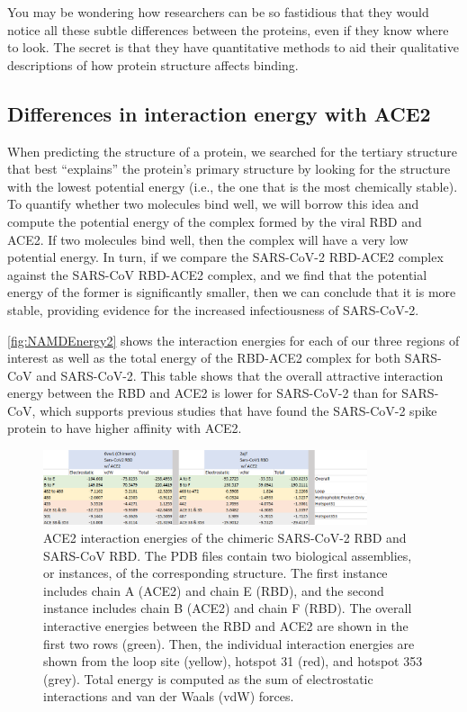 You may be wondering how researchers can be so fastidious that they would notice all these subtle differences between the proteins, even if they know where to look. The secret is that they have quantitative methods to aid their qualitative descriptions of how protein structure affects binding.

\FloatBarrier
{}
\subsection{Differences in interaction energy with ACE2}

When predicting the structure of a protein, we searched for the tertiary structure that best ``explains'' the protein's primary structure by looking for the structure with the lowest potential energy (i.e., the one that is the most chemically stable). To quantify whether two molecules bind well, we will borrow this idea and compute the potential energy of the complex formed by the viral RBD and ACE2. If two molecules bind well, then the complex will have a very low potential energy. In turn, if we compare the SARS-CoV-2 RBD-ACE2 complex against the SARS-CoV RBD-ACE2 complex, and we find that the potential energy of the former is significantly smaller, then we can conclude that it is more stable, providing evidence for the increased infectiousness of SARS-CoV-2.

\autoref{fig:NAMDEnergy2} shows the interaction energies for each of our three regions of interest as well as the total energy of the RBD-ACE2 complex for both SARS-CoV and SARS-CoV-2. This table shows that the overall attractive interaction energy between the RBD and ACE2 is lower for SARS-CoV-2 than for SARS-CoV, which supports previous studies that have found the SARS-CoV-2 spike protein to have higher affinity with ACE2.\\

\begin{figure}[h]
	\centering
	\mySfFamily
	\includegraphics[width = 0.85\textwidth]{../images/NAMDEnergy2.png}
	\caption{ACE2 interaction energies of the chimeric SARS-CoV-2 RBD and SARS-CoV RBD. The PDB files contain two biological assemblies, or instances, of the corresponding structure. The first instance includes chain A (ACE2) and chain E (RBD), and the second instance includes chain B (ACE2) and chain F (RBD). The overall interactive energies between the RBD and ACE2 are shown in the first two rows (green). Then, the individual interaction energies are shown from the loop site (yellow), hotspot 31 (red), and hotspot 353 (grey). Total energy is computed as the sum of electrostatic interactions and van der Waals (vdW) forces.}
	\label{fig:NAMDEnergy2}
\end{figure}

